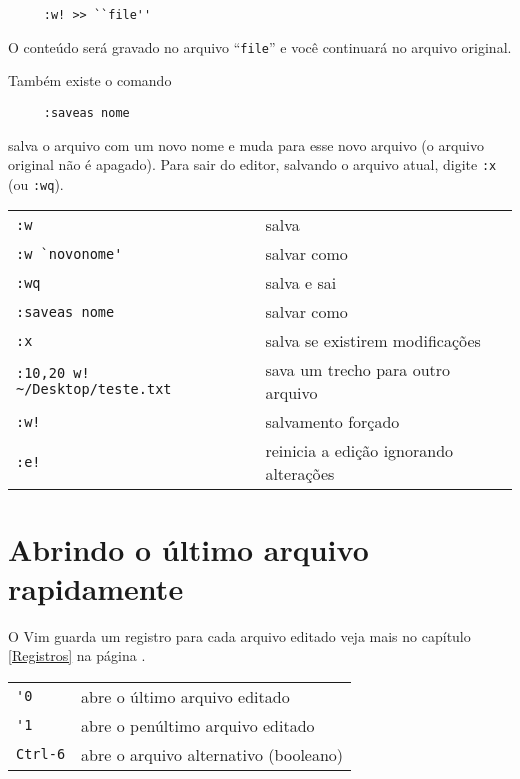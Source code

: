 \begin{verbatim}
     :w! >> ``file''
\end{verbatim}

O conteúdo será gravado no arquivo ``{\tt file}'' e você continuará no arquivo original.

Também existe o comando

\begin{verbatim}
     :saveas nome
\end{verbatim}

salva o arquivo com um novo nome e muda para esse novo arquivo (o arquivo
original não é apagado).  Para sair do editor, salvando o arquivo atual, digite
{\tt :x} (ou {\tt :wq}).

\begin{table}[htb]\begin{center} \begin{tabular}{ll} \hline
     \verb|:w| & salva\\
     \verb|:w `novonome'| & salvar como\\
     \verb|:wq| & salva e sai\\
     \verb|:saveas nome| & salvar como\\
     \verb|:x| & salva se existirem modificações\\
     \verb|:10,20 w! ~/Desktop/teste.txt | & sava um trecho para outro arquivo\\
     \verb|:w!| & salvamento forçado\\
     \verb|:e!| & reinicia a edição ignorando alterações\\
\hline \end{tabular}\end{center}\end{table}


\section{Abrindo o último arquivo rapidamente}

O Vim guarda um registro para cada arquivo editado veja
mais no capítulo \ref{Registros} na página \pageref{Registros}.

\begin{table}[htb]\begin{center} \begin{tabular}{ll} \hline
     \verb|'0| &  abre o último arquivo editado\\
     \verb|'1| & abre o penúltimo arquivo editado\\
     \verb|Ctrl-6| & abre o arquivo alternativo (booleano)\\
\hline \end{tabular}\end{center}\end{table}

